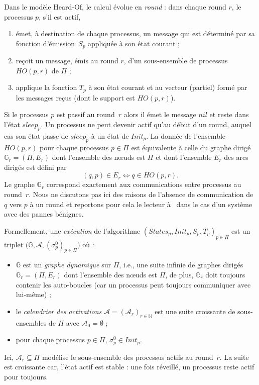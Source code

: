 \documentclass{article}
\begin{document}
Dans le mod\`ele Heard-Of, le calcul \'evolue en \emph{round} : dans chaque round $r$, 
	le processus $p$, s'il est actif,  
	\begin{enumerate}
	\item \'emet, \`a destination de chaque processus, un message qui est d\'etermin\'e par sa fonction d'\'emission~$S_p$  
		appliqu\'ee \`a son \'etat courant ;
	\item re\c{c}oit un message, \'emis au round $r$, d'un sous-ensemble de processus $HO(p,r)$ de $\Pi$ ;
        \item  applique la fonction  $T_p$ \`a son \'etat courant  et au vecteur (partiel) form\'e par les messages re\c{c}us (dont le support est 
         $HO(p,r)$).
	\end{enumerate}
Si le processus $p$ est passif au round~$r$ alors il \'emet le message $nil$ et reste dans l'\'etat $sleep_p$.
Un processus ne peut devenir actif qu'au d\'ebut d'un round, auquel cas son \'etat passe de $sleep_p$ \`a 
	un \'etat de $Init_p$.
La donn\'ee de l'ensemble $HO(p,r)$ pour chaque processus $p \in \Pi$ est \'equivalente \`a celle du graphe dirig\'e
	$\mathds{G}_r = (\Pi, E_r)$ dont l'ensemble des n\oe uds est $\Pi$ et dont l'ensemble $E_r$ des arcs dirig\'es 
	est d\'efini par
	$$ (q,p) \in E_r \Leftrightarrow q \in HO(p,r) .$$	
Le graphe $\mathds{G}_r $ correspond exactement aux communications entre processus au round~$r$.
Nous ne discutons pas ici des raisons de l'absence de communication de $q$ vers $p$ \`a un round et reportons pour cela  le lecteur 
	\`a~\cite{CB09} dans le cas d'un syst\`eme avec des pannes b\'enignes.

Formellement, une \emph{ex\'ecution} de l'algorithme  $(States_p, Init_p, S_p,T_p)_{p\in \Pi}$ est 
	un triplet $\big( \mathds{G} ,  \mathcal{A} , (\sigma^0_p)_{p \in \Pi} \big)$ où :
	\begin{itemize}
		\item $\mathds{G}$ est un \emph{graphe dynamique} sur $\Pi$, i.e., une suite infinie de graphes dirig\'es 
			$\mathds{G}_r = (\Pi, E_r)$ dont l'ensemble des n\oe uds est $\Pi$, 
			de plus, $\mathds{G}_r$ doit toujours contenir les auto-boucles (car un processus peut toujours communiquer avec lui-même) ; 
		\item le \emph{calendrier des activations} $\mathcal{A} = (\mathcal{A}_r)_{r \in \mathds{N}}$ est une suite 
			croissante de sous-ensembles de $\Pi$ 
			avec $\mathcal{A}_0 = \emptyset$ ;
		\item pour chaque processus $p\in \Pi$, $\sigma^0_p \in Init_p$.
	\end{itemize}
Ici,  $\mathcal{A}_r \subseteq \Pi$ modélise le sous-ensemble des processus actifs au round~$r$.
La suite est croissante car, l'\'etat actif est stable : une fois r\'eveill\'e, un processus reste actif pour toujours.
\end{document}
